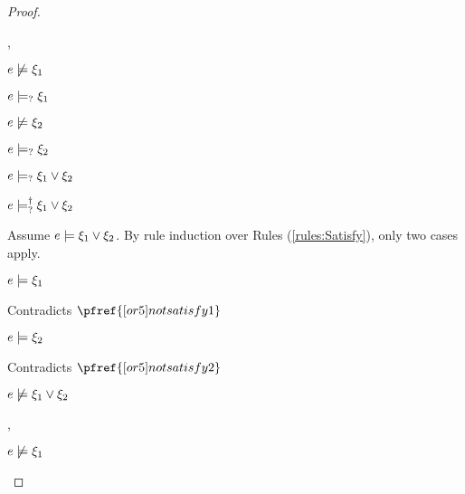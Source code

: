 \begin{proof}
\begin{byCases}
\begin{byCases}
    \item[\cmaysatisfy{e}{\xi_1},\cmaysatisfy{e}{\xi_2}]
        \begin{pfsteps*}
        \item $e \not\models \xi_1$  
        \item $e \models_{?} \xi_1$  
        \item $e \not\models \xi_2$  
        \item $e \models_{?} \xi_2$  
        \item $e \models_{?} \xi_1 \vee \xi_2$  
        \item $e \models_{?}^{\dag} \xi_1 \vee \xi_2$ 
        \end{pfsteps*}
        Assume $e \models \xi_1 \vee \xi_2$. By rule induction over Rules (\ref{rules:Satisfy}), only two cases apply.
        \begin{byCases}
        \item[\text{(\ref{rule:CSOr1})}]
            \begin{pfsteps*}
            \item $e \models \xi_1$ 
            \end{pfsteps*}
            Contradicts $\pfref{[or5]notsatisfy1}$
        \item[\text{(\ref{rule:CSOr2})}]
            \begin{pfsteps*}
            \item $e \models \xi_2$ 
            \end{pfsteps*}
            Contradicts $\pfref{[or5]notsatisfy2}$
        \end{byCases}
        \begin{pfsteps*}
        \item $e \not\models \xi_1 \vee \xi_2$ 
        \end{pfsteps*}
    \item[\cmaysatisfy{e}{\xi_1},\cnotsatisfyormay{e}{\xi_2}]
        \begin{pfsteps*}
        \item $e \not\models \xi_1$  

\end{pfsteps*}
\end{byCases}
\end{byCases}
\end{proof}
